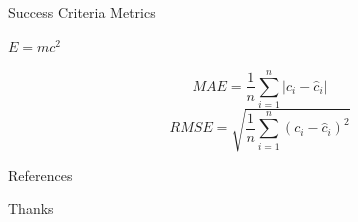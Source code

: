 \documentclass{article}
\begin{document}

\begin{frame}{Success Criteria Metrics}
	\begin{theorem}
		$E = mc^2$
	\end{theorem}
	\begin{equation}
		MAE=\frac{1}{n}\sum_{i=1}^{n}|c_i- \hat{c}_i|
	\end{equation} 
	\begin{equation}
		RMSE=\sqrt{\frac{1}{n}\sum_{i=1}^{n}(c_i - \hat{c}_i)^2}
	\end{equation}
\end{frame}


\begin{frame}[allowframebreaks]{References}
    \printbibliography
\end{frame}


\begin{frame}
    \Huge{\centerline{Thanks}}
\end{frame}

\end{document}
